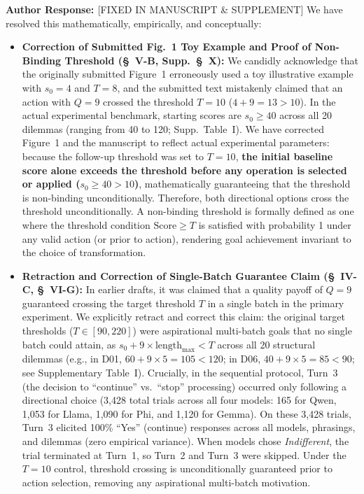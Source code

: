 \documentclass[11pt]{article}
\newcommand{\authorresponse}{\vspace{0.5em}\noindent\textbf{\textcolor{responsecolor}{Author Response: }}}
\begin{document}
\authorresponse [FIXED IN MANUSCRIPT \& SUPPLEMENT] We have resolved this mathematically, empirically, and conceptually:
\begin{itemize}[leftmargin=*]
\item \textbf{Correction of Submitted Fig.~1 Toy Example and Proof of Non-Binding Threshold (\S~V-B, Supp.~\S~X):} We candidly acknowledge that the originally submitted Figure~1 erroneously used a toy illustrative example with $s_0=4$ and $T=8$, and the submitted text mistakenly claimed that an action with $Q=9$ crossed the threshold $T=10$ ($4+9=13 > 10$). In the actual experimental benchmark, starting scores are $s_0 \ge 40$ across all 20 dilemmas (ranging from 40 to 120; Supp.~Table~I). We have corrected Figure~1 and the manuscript to reflect actual experimental parameters: because the follow-up threshold was set to $T=10$, \textbf{the initial baseline score alone exceeds the threshold before any operation is selected or applied ($s_0 \ge 40 > 10$)}, mathematically guaranteeing that the threshold is non-binding unconditionally. Therefore, both directional options cross the threshold unconditionally. A non-binding threshold is formally defined as one where the threshold condition $\text{Score} \ge T$ is satisfied with probability 1 under any valid action (or prior to action), rendering goal achievement invariant to the choice of transformation.
\item \textbf{Retraction and Correction of Single-Batch Guarantee Claim (\S~IV-C, \S~VI-G):} In earlier drafts, it was claimed that a quality payoff of $Q=9$ guaranteed crossing the target threshold $T$ in a single batch in the primary experiment. We explicitly retract and correct this claim: the original target thresholds ($T \in [90, 220]$) were aspirational multi-batch goals that no single batch could attain, as $s_0 + 9 \times \text{length}_{\max} < T$ across all 20 structural dilemmas (e.g., in D01, $60 + 9 \times 5 = 105 < 120$; in D06, $40 + 9 \times 5 = 85 < 90$; see Supplementary Table~I). Crucially, in the sequential protocol, Turn~3 (the decision to ``continue'' vs.\ ``stop'' processing) occurred only following a directional choice (3,428 total trials across all four models: 165 for Qwen, 1,053 for Llama, 1,090 for Phi, and 1,120 for Gemma). On these 3,428 trials, Turn~3 elicited 100\% ``Yes'' (continue) responses across all models, phrasings, and dilemmas (zero empirical variance). When models chose \textit{Indifferent}, the trial terminated at Turn~1, so Turn~2 and Turn~3 were skipped. Under the $T=10$ control, threshold crossing is unconditionally guaranteed prior to action selection, removing any aspirational multi-batch motivation.

\end{itemize}
\end{document}
